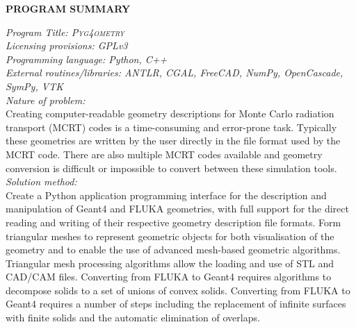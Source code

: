 \documentclass[final,5p,times,twocolumn]{elsarticle}
\newcommand{\PYGEOMETRY}{\textsc{Pyg4ometry}}
\begin{document}


\linenumbers

{\noindent \bf PROGRAM SUMMARY}

\begin{small}
\noindent
{\em Program Title: \PYGEOMETRY{} }                                         		\\
{\em Licensing provisions: GPLv3 }							\\
{\em Programming language: Python, C++}                         		\\
{\em External routines/libraries: ANTLR, CGAL, FreeCAD, NumPy, OpenCascade, SymPy, VTK} \\
{\em Nature of problem:}\\  %
Creating computer-readable geometry descriptions for Monte Carlo radiation transport (MCRT) codes is a time-consuming and error-prone task.
Typically these geometries are written by the user directly in the file format used by the MCRT code. There are also multiple MCRT codes
available and geometry conversion is difficult or impossible to convert between these simulation tools.
\\
{\em Solution method:}\\  %
Create a Python application programming interface for the description and manipulation of Geant4 and FLUKA geometries, with full support for
the direct reading and writing of their respective geometry description file formats.
Form triangular meshes to represent geometric objects for both visualisation of the
geometry and to enable the use of advanced mesh-based geometric algorithms. Triangular mesh processing algorithms allow the loading and use of STL and CAD/CAM
files. Converting from FLUKA to Geant4 requires algorithms to decompose solids to a set of unions of convex solids. Converting from
FLUKA to Geant4 requires a number of steps including the replacement of infinite surfaces with finite solids and the automatic elimination of overlaps.


\end{small}
\end{document}
